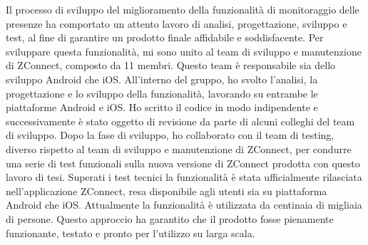 Il processo di sviluppo del miglioramento della funzionalità di monitoraggio delle presenze ha comportato un attento lavoro di analisi, progettazione, sviluppo e test, al fine di garantire un prodotto finale affidabile e soddisfacente.
Per sviluppare questa funzionalità, mi sono unito al team di sviluppo e manutenzione di ZConnect, composto da 11 membri. Questo team è responsabile sia dello sviluppo Android che iOS. All'interno del gruppo, ho svolto l'analisi, la progettazione e lo sviluppo della funzionalità, lavorando su entrambe le piattaforme Android e iOS. Ho scritto il codice in modo indipendente e successivamente è stato oggetto di revisione da parte di alcuni colleghi del team di sviluppo. Dopo la fase di sviluppo, ho collaborato con il team di testing, diverso rispetto al team di sviluppo e manutenzione di ZConnect, per condurre una serie di test funzionali sulla nuova versione di ZConnect prodotta con questo lavoro di tesi.
Superati i test tecnici la funzionalità è stata ufficialmente rilasciata nell'applicazione ZConnect, resa disponibile agli utenti sia su piattaforma Android che iOS. Attualmente la funzionalità è utilizzata da centinaia di migliaia di persone.
Questo approccio ha garantito che il prodotto fosse pienamente funzionante, testato e pronto per l'utilizzo su larga scala.
